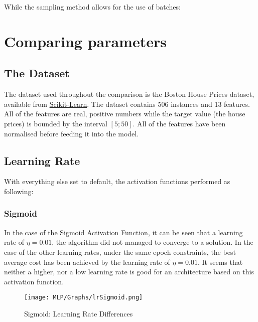 \documentclass{report}
\begin{document}


While the sampling method allows for the use of batches:





\section{Comparing parameters}

\subsection{The Dataset}

The dataset used throughout the comparison is the Boston House Prices dataset, available from \href{https://scikit-learn.org/stable/modules/generated/sklearn.datasets.load_boston.html#sklearn.datasets.load_boston}{Scikit-Learn}. The dataset contains 506 instances and 13 features. All of the features are real, positive numbers while the target value (the house prices) is bounded by the interval $[5;50]$. All of the features have been normalised before feeding it into the model.

\newpage
\subsection{Learning Rate}
With everything else set to default, the activation functions performed as following: 

\subsubsection{Sigmoid}

In the case of the Sigmoid Activation Function, it can be seen that a learning rate of $\eta = 0.01$, the algorithm did not managed to converge to a solution. In the case of the other learning rates, under the same epoch constraints, the best average cost has been achieved by the learning rate of $\eta = 0.01$. It seems that neither a higher, nor a low learning rate is good for an architecture based on this activation function.
\begin{figure}[htp]
\centering
\texttt{[image: MLP/Graphs/lrSigmoid.png]}
\caption{Sigmoid: Learning Rate Differences}
\label{sigmoidLr}
\end{figure}
\end{document}
